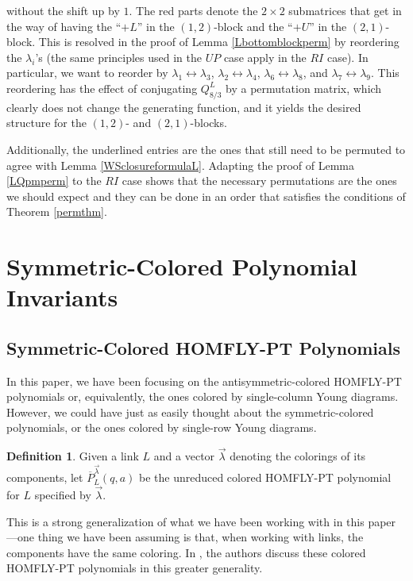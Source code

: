 \documentclass[11pt]{amsart}
\theoremstyle{plain}
\theoremstyle{definition}
\newtheorem{definitionN}[theoremN]{Definition}
\theoremstyle{remark}
\begin{document}
without the shift up by $1$. The red parts denote the $2\times 2$ submatrices that get in the way of having the ``$+L$'' in the $(1,2)$-block and the ``$+U$'' in the $(2,1)$-block. This is resolved in the proof of Lemma \ref{Lbottomblockperm} by reordering the $\lambda_i$'s (the same principles used in the $UP$ case apply in the $RI$ case). In particular, we want to reorder by $\lambda_1\leftrightarrow \lambda_3$, $\lambda_2\leftrightarrow \lambda_4$, $\lambda_6\leftrightarrow \lambda_8$, and $\lambda_7\leftrightarrow \lambda_9$. This reordering has the effect of conjugating $Q_{8/3}^L$ by a permutation matrix, which clearly does not change the generating function, and it yields the desired structure for the $(1,2)$- and $(2,1)$-blocks.

Additionally, the underlined entries are the ones that still need to be permuted to agree with Lemma \ref{WSclosureformulaL}. Adapting the proof of Lemma \ref{LQpmperm} to the $RI$ case shows that the necessary permutations are the ones we should expect and they can be done in an order that satisfies the conditions of Theorem \ref{permthm}.

\section{Symmetric-Colored Polynomial Invariants}
\label{sympolysec}

\subsection{Symmetric-Colored HOMFLY-PT Polynomials}

In this paper, we have been focusing on the antisymmetric-colored HOMFLY-PT polynomials or, equivalently, the ones colored by single-column Young diagrams. However, we could have just as easily thought about the symmetric-colored polynomials, or the ones colored by single-row Young diagrams. 

\begin{definitionN}
    Given a link $L$ and a vector $\vec{\lambda}$ denoting the colorings of its components, let $\overline{P}^{\vec{\lambda}}_L(q,a)$ be the unreduced colored HOMFLY-PT polynomial for $L$ specified by $\vec{\lambda}$.
\end{definitionN}

This is a strong generalization of what we have been working with in this paper---one thing we have been assuming is that, when working with links, the components have the same coloring. In \cite{LZ10}, the authors discuss these colored HOMFLY-PT polynomials in this greater generality.
\end{document}

